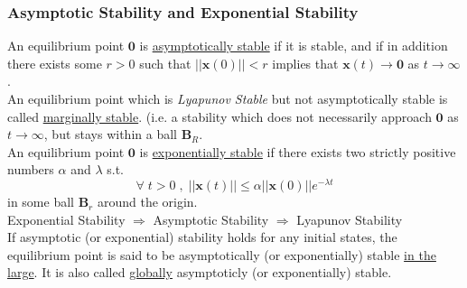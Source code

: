 \documentclass[11pt,handout]{beamer}   %
\begin{document}
\begin{frame}
\frametitle{Asymptotic Stability and Exponential Stability}
\small
An equilibrium point $\mathbf{0}$ is \underline{asymptotically stable} if it is stable, and if in addition there exists some $r>0$ such that $||\mathbf{x}(0)||<r$ implies that $\mathbf{x}(t) \rightarrow \mathbf{0}$ as $t \rightarrow \infty$.\\
\vspace{6pt}
An equilibrium point which is \textit{Lyapunov Stable} but not asymptotically stable is called \underline{marginally stable}. (i.e. a stability which does not necessarily approach $\mathbf{0}$ as $t \rightarrow \infty$, but stays within a ball $\mathbf{B}_R$.\\
\vspace{6pt}
An equilibrium point $\mathbf{0}$ is \underline{exponentially stable} if there exists two strictly positive numbers $\alpha$ and $\lambda$ s.t.
\begin{equation*}
\forall \; t > 0 \; , \; ||\mathbf{x}(t)|| \leq \alpha ||\mathbf{x}(0)|| e^{-\lambda t}
\end{equation*}
in some ball $\mathbf{B}_r$ around the origin.\\
\vspace{6pt}
Exponential Stability $\Rightarrow$ Asymptotic Stability $\Rightarrow$ Lyapunov Stability\\
\vspace{6pt}
If asymptotic (or exponential) stability holds for any initial states, the equilibrium point is said to be asymptotically (or exponentially) stable \underline{in the large}. It is also called \underline{globally} asymptoticly (or exponentially) stable. 
\end{frame}
\end{document}
